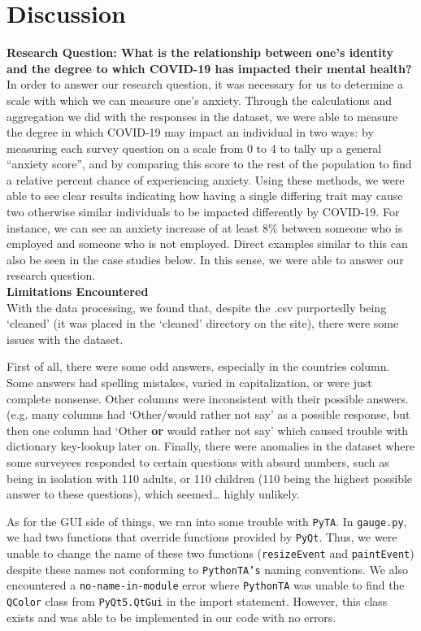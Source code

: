 \documentclass[fontsize=11pt]{article}
\begin{document}
    \section*{Discussion}
    \textbf{Research Question: What is the relationship between one’s identity and the degree to which COVID-19 has impacted their mental health?} \\
    In order to answer our research question, it was necessary for us to determine a scale with which we can measure one’s anxiety. Through the calculations and aggregation we did with the responses in the dataset, we were able to measure the degree in which COVID-19 may impact an individual in two ways: by measuring each survey question on a scale from 0 to 4 to tally up a general “anxiety score”, and by comparing this score to the rest of the population to find a relative percent chance of experiencing anxiety. Using these methods, we were able to see clear results indicating how having a single differing trait may cause two otherwise similar individuals to be impacted differently by COVID-19. For instance, we can see an anxiety increase of at least 8\% between someone who is employed and someone who is not employed. Direct examples similar to this can also be seen in the case studies below. In this sense, we were able to answer our research question. \\

    \textbf{Limitations Encountered} \\
    With the data processing, we found that, despite the .csv purportedly being ‘cleaned’ (it was placed in the ‘cleaned’ directory on the site), there were some issues with the dataset.

    First of all, there were some odd answers, especially in the countries column. Some answers had spelling mistakes, varied in capitalization, or were just complete nonsense. Other columns were inconsistent with their possible answers. (e.g. many columns had ‘Other/would rather not say’ as a possible response, but then one column had ‘Other \textbf{or} would rather not say’ which caused trouble with dictionary key-lookup later on. Finally, there were anomalies in the dataset where some surveyees responded to certain questions with absurd numbers, such as being in isolation with 110 adults, or 110 children (110 being the highest possible answer to these questions), which seemed… highly unlikely.

    As for the GUI side of things, we ran into some trouble with \texttt{PyTA}. In \texttt{gauge.py}, we had two functions that override functions provided by \texttt{PyQt}. Thus, we were unable to change the name of these two functions (\texttt{resizeEvent} and \texttt{paintEvent}) despite these names not conforming to \texttt{PythonTA’s} naming conventions. We also encountered a \texttt{no-name-in-module} error where \texttt{PythonTA} was unable to find the \texttt{QColor} class from \texttt{PyQt5.QtGui} in the import statement. However, this class exists and was able to be implemented in our code with no errors. \\
\end{document}
